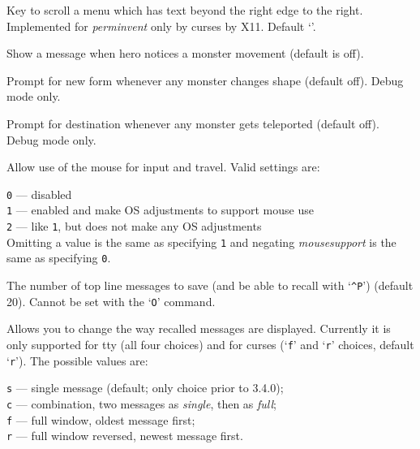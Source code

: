 \documentclass[titlepage]{article}
\begin{document}
\begin{description}[font=\mdseries\itshape]
\item[menu\textunderscore shift\textunderscore right]
Key to scroll a menu which has text beyond the
right edge to the right.
Implemented for \textit{perm\textunderscore invent} only by curses by X11.
Default `\texttt{\textbraceright}'.
\item[mon\textunderscore movement]
Show a message when hero notices a monster movement (default is off).
\item[monpolycontrol]
Prompt for new form whenever any monster changes shape (default off).
Debug mode only.
\item[montelecontrol]
Prompt for destination whenever any monster gets teleported (default off).
Debug mode only.
\item[mouse\textunderscore support]
Allow use of the mouse for input and travel.
Valid settings are:

\texttt{0} --- disabled\\
\texttt{1} --- enabled and make OS adjustments to support mouse use\\
\texttt{2} --- like \texttt{1}, but does not make any OS adjustments\\

Omitting a value is the same as specifying \texttt{1}
and negating
\textit{mouse\textunderscore support}
is the same as specifying \texttt{0}.
\item[msghistory]
The number of top line messages to save (and be able to recall
with `\texttt{\textasciicircum P}') (default 20).
Cannot be set with the `\texttt{O}' command.
\item[msg\textunderscore window]
Allows you to change the way recalled messages are displayed.
Currently it is only supported for tty (all four choices) and for curses
(`\texttt{f}' and `\texttt{r}' choices, default `\texttt{r}').
The possible values are:

\texttt{s} --- single message (default; only choice prior to 3.4.0);\\
\texttt{c} --- combination, two messages as \textit{single}, then as \textit{full};\\
\texttt{f} --- full window, oldest message first;\\
\texttt{r} --- full window reversed, newest message first.


\end{description}
\end{document}
